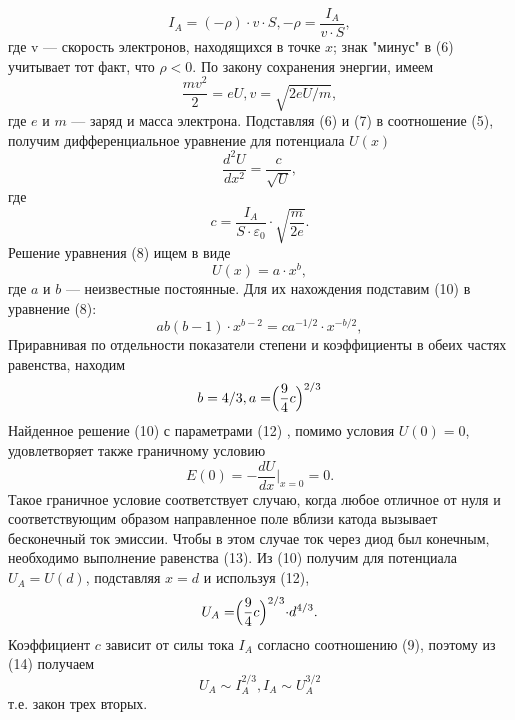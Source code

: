 \documentclass[a4paper,12pt]{article}
\begin{document}
\begin{equation}
I_A = (-\rho) \cdot v \cdot S, -\rho = \frac{I_A}{v \cdot S},
\end{equation} где v — скорость электронов, находящихся в точке $x$; знак "минус" в (6) учитывает тот факт, что $\rho < 0$. По закону сохранения энергии, имеем
\begin{equation}
\frac{mv^2}{2} = eU, v = \sqrt{2eU/m},
\end{equation} где $e$ и $m$ — заряд и масса электрона. Подставляя (6) и (7) в соотношение (5), получим дифференциальное уравнение для потенциала $U(x)$
\begin{equation}
\frac{d^2U}{dx^2} = \frac{c}{\sqrt{U}},
\end{equation} где
\begin{equation}
c = \frac{I_A}{S \cdot \varepsilon_0} \cdot \sqrt{\frac{m}{2e}}.
\end{equation} Решение уравнения (8) ищем в виде
\begin{equation}
U(x) = a \cdot x^b,
\end{equation} где $a$ и $b$ — неизвестные постоянные. Для их нахождения подставим (10) в уравнение (8):
\begin{equation}
ab(b-1)\cdot x^{b-2} = ca^{-1/2}\cdot x^{-b/2},
\end{equation} Приравнивая по отдельности показатели степени и коэффициенты в обеих частях равенства, находим
\begin{equation}
b = 4/3, a = \Bigr(\frac{9}{4}c\Bigl)^{2/3}
\end{equation} Найденное решение (10) с параметрами (12) , помимо условия $U(0) = 0$, удовлетворяет также граничному условию
\begin{equation}
E(0) = - \frac{dU}{dx} \bigg|_{x=0} = 0.
\end{equation} Такое граничное условие соответствует случаю, когда любое отличное от нуля и соответствующим образом направленное поле вблизи катода вызывает бесконечный ток эмиссии. Чтобы в этом случае ток через диод был конечным, необходимо выполнение равенства (13). Из (10) получим для потенциала $U_A = U(d)$, подставляя $x = d$ и используя (12),
\begin{equation}
U_A = \Bigr( \frac{9}{4}c \Bigl)^{2/3} \cdot d^{4/3}.
\end{equation} Коэффициент $c$ зависит от силы тока $I_A$ согласно соотношению (9), поэтому из (14) получаем
\begin{equation}
U_A \sim I_A^{2/3} , I_A \sim U_A^{3/2}
\end{equation} т.е. закон трех вторых.
\end{document}
